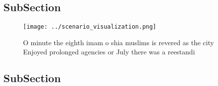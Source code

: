 \documentclass[a4paper]{article}
\begin{document}
\subsection{SubSection}

\begin{figure}
\centering
\texttt{[image: ../scenario\_visualization.png]}
\caption{O minute the eighth imam o shia muslims is revered as the city Enjoyed prolonged agencies or July there was a reestandi
}
\end{figure}
 
\subsection{SubSection}
\end{document}
